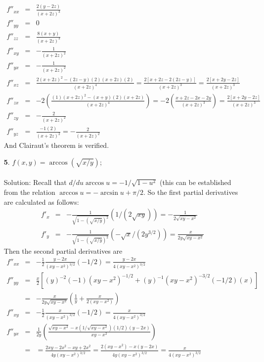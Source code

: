 \documentclass[12pt]{amsbook}
\begin{document}
\begin{enumerate}
\begin{eqnarray*}
f''_{xx}&=& \frac{2(y-2z)}{(x+2z)^3} \\
f''_{yy}&=& 0 \\
f''_{zz}&=& \frac{8(x+y)}{(x+2z)^3} \\
f''_{xy}&=& -\frac{1}{(x+2z)^2} \\
f''_{yx}&=& -\frac{1}{(x+2z)^2} \\
f''_{xz}&=& \frac{2(x+2z)^2-(2z-y)(2)(x+2z)(2)}{(x+2z)^4}=\frac{2[x+2z-2(2z-y)]}{(x+2z)^3}=\frac{2[x+2y-2z]}{(x+2z)^3} \\
f''_{zx}&=& -2(\frac{(1)(x+2z)^2-(x+y)(2)(x+2z)}{(x+2z)^4})=-2(\frac{x+2z-2x-2y}{(x+2z)^3})=\frac{2[x+2y-2z]}{(x+2z)^3} \\
f''_{zy}&=& -\frac{2}{(x+2z)^2} \\
f''_{yz}&=& \frac{-1(2)}{(x+2z)^2}=-\frac{2}{(x+2z)^2}
\end{eqnarray*}
And Clairaut's theorem is verified.
\\
\item[{\small\bf 5}.] $f(x,y)=\arccos(\sqrt{x/y})$;
\\
\\
{\sc Solution}: Recall that $d/du \arccos u= -1/\sqrt{1-u^2}$ (this can be established from the relation $\arccos u = -\arcsin u +\pi/2$. So the first partial derivatives are calculated as follows:
\begin{eqnarray*}
f'_x&=& -\frac{1}{\sqrt{1-(\sqrt{x/y})^2}}(1/(2\sqrt{xy}))=-\frac{1}{2\sqrt{xy-x^2}} \\
f'_y&=& -\frac{1}{\sqrt{1-(\sqrt{x/y})^2}}(-\sqrt{x}/(2y^{3/2}))=\frac{x}{2y\sqrt{xy-x^2}} 
\end{eqnarray*}
Then the second partial derivatives are
\begin{eqnarray*}
f''_{xx}&=& -\frac 12 \frac{y-2x}{(xy-x^2)^{3/2}}(-1/2)=\frac{y-2x}{4(xy-x^2)^{3/2}} \\
f''_{yy}&=& \frac x2 [(y)^{-2}(-1)(xy-x^2)^{-1/2}+(y)^{-1}(xy-x^2)^{-3/2}(-1/2)(x)] \\
&=&-\frac{x}{2y\sqrt{xy-x^2}}(\frac 1y + \frac{x}{2(xy-x^2)}) \\
f''_{xy}&=& -\frac 12 \frac{x}{(xy-x^2)^{3/2}}(-1/2)=\frac{x}{4(xy-x^2)^{3/2}}\\
f''_{yx}&=& \frac{1}{2y}(\frac{\sqrt{xy-x^2}-x(1/\sqrt{xy-x^2})(1/2)(y-2x)}{xy-x^2}) \\
 &=& =\frac{2xy-2x^2-xy+2x^2}{4y(xy-x^2)^{3/2}} = \frac{2(xy-x^2)-x(y-2x)}{4y(xy-x^2)^{3/2}}=\frac{x}{4(xy-x^2)^{3/2}}
\end{eqnarray*}

\end{enumerate}
\end{document}
